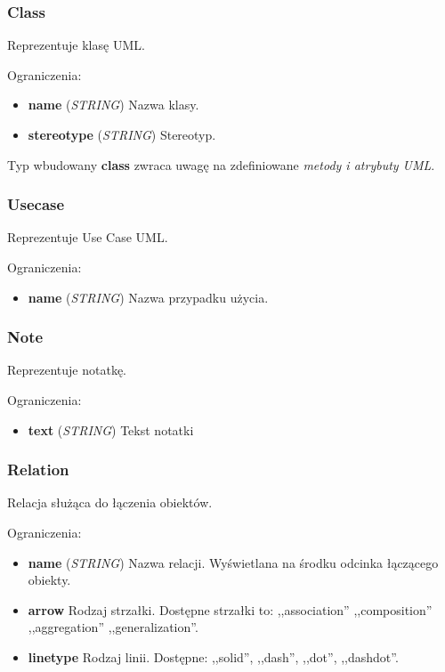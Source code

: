 \subsubsection{Class}
Reprezentuje klasę UML.

Ograniczenia:
\begin{itemize}
	\item \textbf{name} (\emph{STRING}) Nazwa klasy.
	\item \textbf{stereotype} (\emph{STRING}) Stereotyp.
\end{itemize}

Typ wbudowany \textbf{class} zwraca uwagę na zdefiniowane \emph{metody i atrybuty UML}.

\subsubsection{Usecase}
Reprezentuje Use Case UML.

Ograniczenia:
\begin{itemize}
	\item \textbf{name} (\emph{STRING}) Nazwa przypadku użycia.
\end{itemize}

\subsubsection{Note}
Reprezentuje notatkę.

Ograniczenia:
\begin{itemize}
	\item \textbf{text} (\emph{STRING}) Tekst notatki
\end{itemize}
	
\subsubsection{Relation}
Relacja służąca do łączenia obiektów.

Ograniczenia:
\begin{itemize}
	\item \textbf{name} (\emph{STRING}) Nazwa relacji. Wyświetlana na środku odcinka łączącego obiekty.
	\item \textbf{arrow} Rodzaj strzałki. Dostępne strzałki to: ,,association'' ,,composition'' ,,aggregation'' ,,generalization''.
	\item \textbf{linetype} Rodzaj linii. Dostępne: ,,solid'', ,,dash'', ,,dot'', ,,dashdot''.
\end{itemize}

